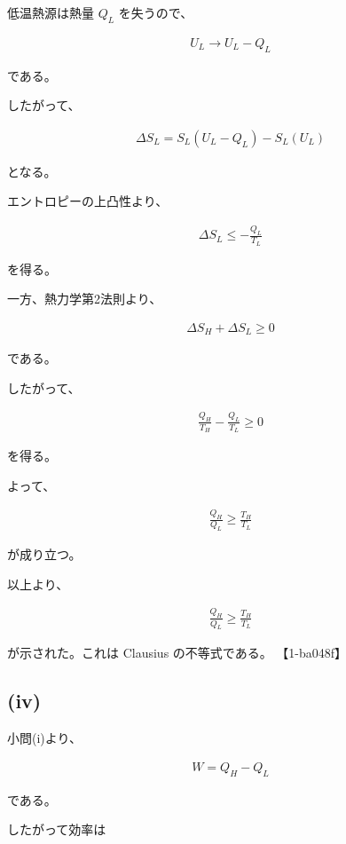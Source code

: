 \documentclass[platex,dvipdfmx,a4paper]{jsarticle}
\begin{document}
低温熱源は熱量 $Q_L$ を失うので、

\begin{align*}
U_L
\rightarrow
U_L-Q_L
\end{align*}

である。

したがって、

\begin{align*}
\Delta S_L
=
S_L(U_L-Q_L)-S_L(U_L)
\end{align*}

となる。

エントロピーの上凸性より、

\begin{align*}
\Delta S_L
\le
-\frac{Q_L}{T_L}
\end{align*}

を得る。

一方、熱力学第2法則より、

\begin{align*}
\Delta S_H+\Delta S_L
\ge
0
\end{align*}

である。

したがって、

\begin{align*}
\frac{Q_H}{T_H}
-
\frac{Q_L}{T_L}
\ge
0
\end{align*}

を得る。

よって、

\begin{align*}
\frac{Q_H}{Q_L}
\ge
\frac{T_H}{T_L}
\end{align*}

が成り立つ。

以上より、

\begin{align*}
\frac{Q_H}{Q_L}
\ge
\frac{T_H}{T_L}
\end{align*}

が示された。これは Clausius の不等式である。 【1-ba048f】

\subsection{(iv)}

小問(i)より、

\begin{align*}
W
=
Q_H-Q_L
\end{align*}

である。

したがって効率は
\end{document}
